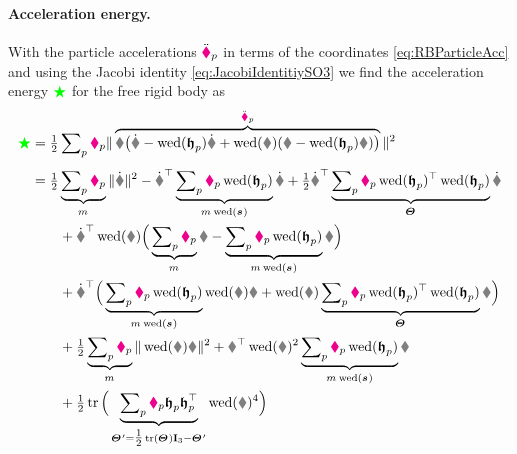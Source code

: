\paragraph{Acceleration energy.}
With the particle accelerations $\ddot{\boldsymbol{\textcolor{magenta}{\blacklozenge}}}_{p}$ in terms of the coordinates \eqref{eq:RBParticleAcc} and using the Jacobi identity \eqref{eq:JacobiIdentitiySO3} we find the acceleration energy $\textcolor{green}{\bigstar}$ for the free rigid body as
\begin{align}\label{eq:RigidBodyAccEnergy}
 \accEnergy &= \tfrac{1}{2} \sumParticles \particleMass{\PidxI} \norm{\overbrace{\R \big( \vd - \wedOp(\particleBodyPos{\PidxI})\wdot + \wedOp(\w)(\v - \wedOp(\particleBodyPos{\PidxI})\w) \big)}^{\particlePosdd{\PidxI}}}^2
\nonumber\\[1ex]
 &= \tfrac{1}{2} \underbrace{\sumParticles \particleMass{\PidxI}}_{\bodyMass{}{}} \norm{\vd}^2
  - \vd^\top \underbrace{\sumParticles \particleMass{\PidxI} \wedOp(\particleBodyPos{\PidxI})}_{\bodyMass{}{} \wedOp(\bodyCOM{}{})} \wdot
  + \tfrac{1}{2} \wdot^\top \underbrace{\sumParticles \particleMass{\PidxI} \wedOp(\particleBodyPos{\PidxI})^\top \wedOp(\particleBodyPos{\PidxI})}_{\bodyMOI{}{}} \wdot
\nonumber\\
 &\qquad+ \vd^\top \wedOp(\w) \Big( \underbrace{\sumParticles \particleMass{\PidxI}}_{\bodyMass{}{}}\v - \underbrace{\sumParticles \particleMass{\PidxI} \wedOp(\particleBodyPos{\PidxI})}_{\bodyMass{}{} \wedOp(\bodyCOM{}{})} \w \Big)
\nonumber\\
 &\qquad+ \wdot^\top \Big( \underbrace{\sumParticles \particleMass{\PidxI} \wedOp(\particleBodyPos{\PidxI})}_{\bodyMass{}{} \wedOp(\bodyCOM{}{})} \wedOp(\w) \v +  \wedOp(\w) \underbrace{\sumParticles \particleMass{\PidxI} \wedOp(\particleBodyPos{\PidxI})^\top \wedOp(\particleBodyPos{\PidxI})}_{\bodyMOI{}{}} \w \Big)
\nonumber\\
 &\qquad+ \tfrac{1}{2} \underbrace{\sumParticles \particleMass{\PidxI}}_{\bodyMass{}{}} \norm{\wedOp(\w)\v}^2
 + \v^\top \wedOp(\w)^2 \underbrace{\sumParticles \particleMass{\PidxI} \wedOp(\particleBodyPos{\PidxI})}_{\bodyMass{}{} \wedOp(\bodyCOM{}{})} \w
\nonumber\\
 &\qquad+ \tfrac{1}{2} \tr \Big( \underbrace{\sumParticles \particleMass{\PidxI} \particleBodyPos{\PidxI} \particleBodyPos{\PidxI}^\top}_{\bodyMOIp{}{} = \tfrac{1}{2}\tr(\bodyMOI{}{}) \idMat[3] - \bodyMOIp{}{}} \wedOp(\w)^4 \Big)
\end{align}
